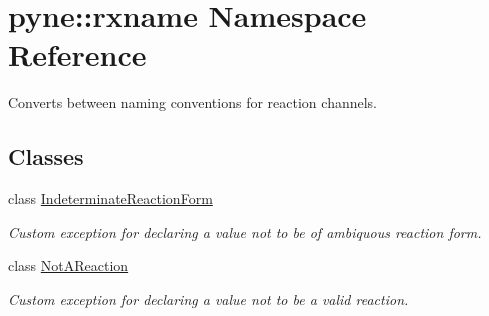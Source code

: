 \hypertarget{namespacepyne_1_1rxname}{\section{pyne\+:\+:rxname Namespace Reference}
\label{namespacepyne_1_1rxname}
}


Converts between naming conventions for reaction channels.  


\subsection*{Classes}
\begin{DoxyCompactItemize}
\item 
class \hyperlink{classpyne_1_1rxname_1_1_indeterminate_reaction_form}{Indeterminate\+Reaction\+Form}
\begin{DoxyCompactList}\small\item\em Custom exception for declaring a value not to be of ambiquous reaction form. \end{DoxyCompactList}\item 
class \hyperlink{classpyne_1_1rxname_1_1_not_a_reaction}{Not\+A\+Reaction}
\begin{DoxyCompactList}\small\item\em Custom exception for declaring a value not to be a valid reaction. \end{DoxyCompactList}\end{DoxyCompactItemize}
